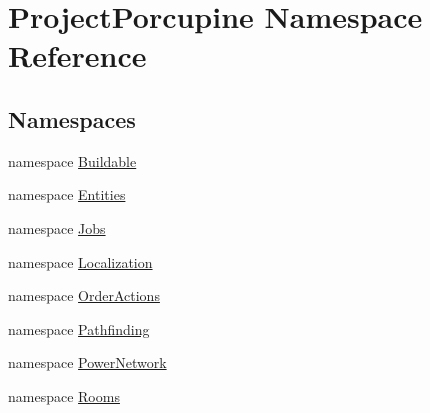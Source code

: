 \hypertarget{namespace_project_porcupine}{}\section{Project\+Porcupine Namespace Reference}
\label{namespace_project_porcupine}
\subsection*{Namespaces}
\begin{DoxyCompactItemize}
\item 
namespace \hyperlink{namespace_project_porcupine_1_1_buildable}{Buildable}
\item 
namespace \hyperlink{namespace_project_porcupine_1_1_entities}{Entities}
\item 
namespace \hyperlink{namespace_project_porcupine_1_1_jobs}{Jobs}
\item 
namespace \hyperlink{namespace_project_porcupine_1_1_localization}{Localization}
\item 
namespace \hyperlink{namespace_project_porcupine_1_1_order_actions}{Order\+Actions}
\item 
namespace \hyperlink{namespace_project_porcupine_1_1_pathfinding}{Pathfinding}
\item 
namespace \hyperlink{namespace_project_porcupine_1_1_power_network}{Power\+Network}
\item 
namespace \hyperlink{namespace_project_porcupine_1_1_rooms}{Rooms}
\end{DoxyCompactItemize}
